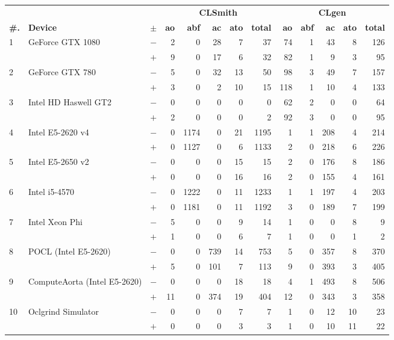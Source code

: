\begin{tabular}{lll | rrrrr | rrrrr }
  \toprule
  & & & \multicolumn{5}{c|}{\textbf{CLSmith}} & \multicolumn{5}{c}{\textbf{CLgen}} \\
  \textbf{\#.} & \textbf{Device} & $\pm$ &
  \textbf{ao} & \textbf{abf} & \textbf{ac} & \textbf{ato} & \textbf{total} &
  \textbf{ao} & \textbf{abf} & \textbf{ac} & \textbf{ato} & \textbf{total} \\
  \midrule
  \multirow{ 2}{*}{1} & \multirow{ 2}{*}{GeForce GTX 1080} & $-$ & 2 & 0 & 28 & 7 & 37       & 74 & 1 & 43 & 8 & 126 \\& & $+$ & 9 & 0 & 17 & 6 & 32 & 82 & 1 & 9 & 3 & 95 \\
\hline
\multirow{ 2}{*}{2} & \multirow{ 2}{*}{GeForce GTX 780} & $-$ & 5 & 0 & 32 & 13 & 50       & 98 & 3 & 49 & 7 & 157 \\& & $+$ & 3 & 0 & 2 & 10 & 15 & 118 & 1 & 10 & 4 & 133 \\
\hline
\multirow{ 2}{*}{3} & \multirow{ 2}{*}{Intel HD Haswell GT2} & $-$ & 0 & 0 & 0 & 0 & 0       & 62 & 2 & 0 & 0 & 64 \\& & $+$ & 2 & 0 & 0 & 0 & 2 & 92 & 3 & 0 & 0 & 95 \\
\hline
\multirow{ 2}{*}{4} & \multirow{ 2}{*}{Intel E5-2620 v4} & $-$ & 0 & 1174 & 0 & 21 & 1195       & 1 & 1 & 208 & 4 & 214 \\& & $+$ & 0 & 1127 & 0 & 6 & 1133 & 2 & 0 & 218 & 6 & 226 \\
\hline
\multirow{ 2}{*}{5} & \multirow{ 2}{*}{Intel E5-2650 v2} & $-$ & 0 & 0 & 0 & 15 & 15       & 2 & 0 & 176 & 8 & 186 \\& & $+$ & 0 & 0 & 0 & 16 & 16 & 2 & 0 & 155 & 4 & 161 \\
\hline
\multirow{ 2}{*}{6} & \multirow{ 2}{*}{Intel i5-4570} & $-$ & 0 & 1222 & 0 & 11 & 1233       & 1 & 1 & 197 & 4 & 203 \\& & $+$ & 0 & 1181 & 0 & 11 & 1192 & 3 & 0 & 189 & 7 & 199 \\
\hline
\multirow{ 2}{*}{7} & \multirow{ 2}{*}{Intel Xeon Phi} & $-$ & 5 & 0 & 0 & 9 & 14       & 1 & 0 & 0 & 8 & 9 \\& & $+$ & 1 & 0 & 0 & 6 & 7 & 1 & 0 & 0 & 1 & 2 \\
\hline
\multirow{ 2}{*}{8} & \multirow{ 2}{*}{POCL (Intel E5-2620)} & $-$ & 0 & 0 & 739 & 14 & 753       & 5 & 0 & 357 & 8 & 370 \\& & $+$ & 5 & 0 & 101 & 7 & 113 & 9 & 0 & 393 & 3 & 405 \\
\hline
\multirow{ 2}{*}{9} & \multirow{ 2}{*}{ComputeAorta (Intel E5-2620)} & $-$ & 0 & 0 & 0 & 18 & 18       & 4 & 1 & 493 & 8 & 506 \\& & $+$ & 11 & 0 & 374 & 19 & 404 & 12 & 0 & 343 & 3 & 358 \\
\hline
\multirow{ 2}{*}{10} & \multirow{ 2}{*}{Oclgrind Simulator} & $-$ & 0 & 0 & 0 & 7 & 7       & 1 & 0 & 12 & 10 & 23 \\& & $+$ & 0 & 0 & 0 & 3 & 3 & 1 & 0 & 10 & 11 & 22 \\
  \bottomrule
\end{tabular}

